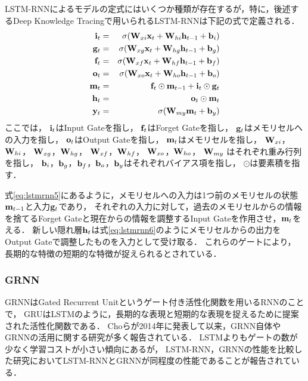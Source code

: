 LSTM-RNNによるモデルの定式にはいくつか種類が存在するが，特に，後述するDeep Knowledge Tracing\cite{piech2015deep}で用いられるLSTM-RNNは下記の式で定義される．
\begin{eqnarray}
\label{eq:lstmrnn1}
{\bf i}_t &=& \sigma({\bf W}_{xi}{\bf x}_t + {\bf W}_{hi}{\bf h}_{t-1} + {\bf b}_i) \\
\label{eq:lstmrnn2}
{\bf g}_t &=& \sigma({\bf W}_{xg}{\bf x}_t + {\bf W}_{hg}{\bf h}_{t-1} + {\bf b}_g) \\
\label{eq:lstmrnn3}
{\bf f}_t &=& \sigma({\bf W}_{xf}{\bf x}_t + {\bf W}_{hf}{\bf h}_{t-1} + {\bf b}_f) \\
\label{eq:lstmrnn4}
{\bf o}_t &=& \sigma({\bf W}_{xo}{\bf x}_t + {\bf W}_{ho}{\bf h}_{t-1} + {\bf b}_o) \\
\label{eq:lstmrnn5}
{\bf m}_t &=& {\bf f}_t \odot {\bf m}_{t-1} + {\bf i}_t \odot {\bf g}_t \\
\label{eq:lstmrnn6}
{\bf h}_t &=& {\bf o}_t \odot {\bf m}_t  \\
\label{eq:lstmrnn7}
{\bf y}_t &=& \sigma({\bf W}_{my} {\bf m}_t + {\bf b}_y) 
\end{eqnarray}
ここでは，
${\bf i}_t$はInput Gateを指し，
${\bf f}_t$はForget Gateを指し，
${\bf g}_t$はメモリセルへの入力を指し，
${\bf o}_t$はOutput Gateを指し，
${\bf m}_t$はメモリセルを指し，
${\bf W}_{xi}$，${\bf W}_{hi}$，
${\bf W}_{xg}$，${\bf W}_{hg}$，
${\bf W}_{xf}$，${\bf W}_{hf}$，
${\bf W}_{xo}$，${\bf W}_{ho}$，
${\bf W}_{my}$
はそれぞれ重み行列を指し，
${\bf b}_i$，${\bf b}_g$，${\bf b}_f$，${\bf b}_o$，${\bf b}_y$はそれぞれバイアス項を指し，
$\odot$は要素積を指す．

式\ref{eq:lstmrnn5}にあるように，メモリセルへの入力は1つ前のメモリセルの状態${\bf m}_{t-1}$と入力${\bf g}_t$であり，
それぞれの入力に対して，過去のメモリセルからの情報を捨てるForget Gateと現在からの情報を調整するInput Gateを作用させ，${\bf m}_t$をえる．
新しい隠れ層${\bf h}_t$は式\ref{eq:lstmrnn6}のようにメモリセルからの出力をOutput Gateで調整したものを入力として受け取る．
これらのゲートにより，
長期的な特徴の短期的な特徴が捉えられるとされている．

\subsubsection{GRNN}
GRNNはGated Recurrent Unit\cite{cho2014learning}というゲート付き活性化関数を用いるRNNのことで，
GRUはLSTMのように，長期的な表現と短期的な表現を捉えるために提案された活性化関数である．
Choら\cite{cho2014learning}が2014年に発表して以来，GRNN自体やGRNNの活用に関する研究が多く報告されている\cite{chung2014empirical, zaremba2015empirical, chung2015gated, karpathy2015visualizing, biswassentiment, pezeshki2015sequence}．
LSTMよりもゲートの数が少なく学習コストが小さい傾向にあるが，
LSTM-RNN，GRNNの性能を比較した研究\cite{chung2014empirical, zaremba2015empirical}においてLSTM-RNNとGRNNが同程度の性能であることが報告されている．

